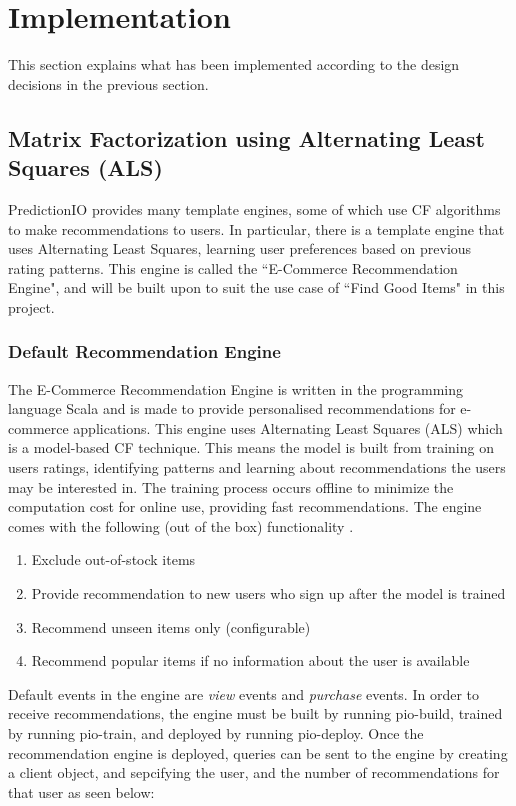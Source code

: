 \section{Implementation}

This section explains what has been implemented according to the design decisions in the previous section.

\subsection{Matrix Factorization using Alternating Least Squares (ALS)}

PredictionIO \cite{predictionio} provides many template engines, some of which use CF algorithms to make recommendations to users. In particular, there is a template engine that uses Alternating Least Squares, learning user preferences based on previous rating patterns. This engine is called the ``E-Commerce Recommendation Engine", and will be built upon to suit the use case of ``Find Good Items" in this project. 

\subsubsection{Default Recommendation Engine}

The E-Commerce Recommendation Engine \cite{predictonio} is written in the programming language Scala and is made to provide personalised recommendations for e-commerce applications. This engine uses Alternating Least Squares (ALS) which is a model-based CF technique. This means the model is built from training on users ratings, identifying patterns and learning about recommendations the users may be interested in. The training process occurs offline to minimize the computation cost for online use, providing fast recommendations. The engine comes with the following (out of the box) functionality \cite{predictionio}.
\begin{enumerate}
 \item Exclude out-of-stock items
 \item Provide recommendation to new users who sign up after the model is trained
 \item Recommend unseen items only (configurable)
 \item Recommend popular items if no information about the user is available
\end{enumerate}

Default events in the engine are \textit{view} events and \textit{purchase} events. In order to receive recommendations, the engine must be built by running pio-build, trained by running pio-train, and deployed by running pio-deploy. Once the recommendation engine is deployed, queries can be sent to the engine by creating a client object, and sepcifying the user, and the number of recommendations for that user as seen below: 

